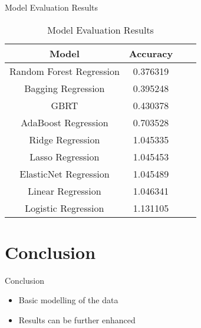 \documentclass[
 size=14pt,
 paper=smartboard,  %
 mode=present, 		%
 display=slides, 	%
 style=tuliplab,  	%
 pauseslide,
 fleqn,leqno]{powerdot}
\begin{document}
\begin{slide}[toc=,bm=]{Model Evaluation Results}

\begin{table}[tb]
\setlength{\abovecaptionskip}{0pt}
\setlength{\belowcaptionskip}{10pt}
\centering
\caption{Model Evaluation Results}

\begin{tabular}{ c | c | c | c }
\toprule
  Model     & Accuracy      \\
\midrule
Random Forest Regression        & 0.376319   \\
Bagging Regression              & 0.395248    \\
GBRT                            & 0.430378   \\
AdaBoost Regression             & 0.703528   \\ 
Ridge Regression                & 1.045335   \\
Lasso Regression                & 1.045453 \\
ElasticNet Regression           & 1.045489 \\
Linear Regression               & 1.046341 \\
Logistic Regression             & 1.131105 \\
\bottomrule
\end{tabular}
\end{table}



\end{slide}


\section{Conclusion}

\begin{slide}[toc=,bm=]{Conclusion}
\begin{itemize}
\item
\smallskip
Basic modelling of the data

\item
\smallskip
Results can be further enhanced

\end{itemize}

\end{slide}
\end{document}
